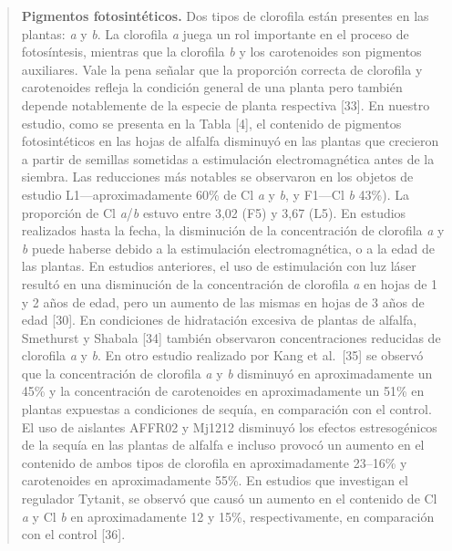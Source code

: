 \documentclass[
]{article}
\begin{document}
\begin{quote}
\textbf{Pigmentos fotosintéticos.} Dos tipos de clorofila están
presentes en las plantas: \emph{a} y \emph{b}. La clorofila \emph{a}
juega un rol importante en el proceso de fotosíntesis, mientras que la
clorofila \emph{b} y los carotenoides son pigmentos auxiliares. Vale la
pena señalar que la proporción correcta de clorofila y carotenoides
refleja la condición general de una planta pero también depende
notablemente de la especie de planta respectiva {[}33{]}. En nuestro
estudio, como se presenta en la Tabla {[}4{]}, el contenido de pigmentos
fotosintéticos en las hojas de alfalfa disminuyó en las plantas que
crecieron a partir de semillas sometidas a estimulación electromagnética
antes de la siembra. Las reducciones más notables se observaron en los
objetos de estudio L1---aproximadamente 60\% de Cl \emph{a} y \emph{b},
y F1---Cl \emph{b} 43\%). La proporción de Cl \emph{a}/\emph{b} estuvo
entre 3,02 (F5) y 3,67 (L5). En estudios realizados hasta la fecha, la
disminución de la concentración de clorofila \emph{a} y \emph{b} puede
haberse debido a la estimulación electromagnética, o a la edad de las
plantas. En estudios anteriores, el uso de estimulación con luz láser
resultó en una disminución de la concentración de clorofila \emph{a} en
hojas de 1 y 2 años de edad, pero un aumento de las mismas en hojas de 3
años de edad {[}30{]}. En condiciones de hidratación excesiva de plantas
de alfalfa, Smethurst y Shabala {[}34{]} también observaron
concentraciones reducidas de clorofila \emph{a} y \emph{b}. En otro
estudio realizado por Kang et al.~{[}35{]} se observó que la
concentración de clorofila \emph{a} y \emph{b} disminuyó en
aproximadamente un 45\% y la concentración de carotenoides en
aproximadamente un 51\% en plantas expuestas a condiciones de sequía, en
comparación con el control. El uso de aislantes AFFR02 y Mj1212
disminuyó los efectos estresogénicos de la sequía en las plantas de
alfalfa e incluso provocó un aumento en el contenido de ambos tipos de
clorofila en aproximadamente 23--16\% y carotenoides en aproximadamente
55\%. En estudios que investigan el regulador Tytanit, se observó que
causó un aumento en el contenido de Cl \emph{a} y Cl \emph{b} en
aproximadamente 12 y 15\%, respectivamente, en comparación con el
control {[}36{]}.
\end{quote}
\end{document}
